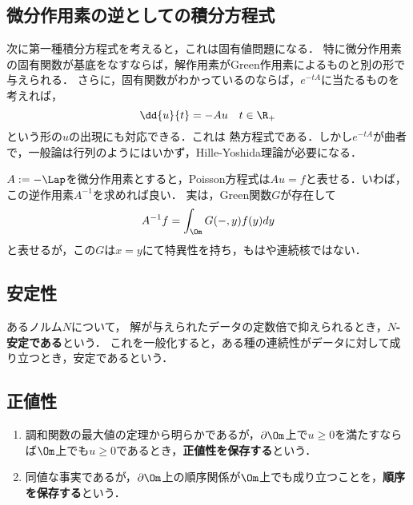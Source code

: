 \documentclass[uplatex,dvipdfmx]{jsreport}
\begin{document}
\subsection{微分作用素の逆としての積分方程式}

\begin{tcolorbox}[colframe=ForestGreen, colback=ForestGreen!10!white,breakable,colbacktitle=ForestGreen!40!white,coltitle=black,fonttitle=\bfseries\sffamily,
title=]
    次に第一種積分方程式を考えると，これは固有値問題になる．
    特に微分作用素の固有関数が基底をなすならば，解作用素がGreen作用素によるものと別の形で与えられる．
    さらに，固有関数がわかっているのならば，$e^{-tA}$に当たるものを考えれば，
    \[\dd{u}{t}=-Au\quad t\in\R_+\]
    という形の$u$の出現にも対応できる．これは
    熱方程式である．しかし$e^{-tA}$が曲者で，一般論は行列のようにはいかず，Hille-Yoshida理論が必要になる．
\end{tcolorbox}

\begin{example}[Laplacianの逆]
    $A:=-\Lap$を微分作用素とすると，Poisson方程式は$Au=f$と表せる．いわば，この逆作用素$A^{-1}$を求めれば良い．
    実は，Green関数$G$が存在して
    \[A^{-1}f=\int_\Om G(-,y)f(y)dy\]
    と表せるが，この$G$は$x=y$にて特異性を持ち，もはや連続核ではない．
\end{example}



\subsection{安定性}

\begin{definition}
    あるノルム$N$について，
    解が与えられたデータの定数倍で抑えられるとき，\textbf{$N$-安定である}という．
    これを一般化すると，ある種の連続性がデータに対して成り立つとき，安定であるという．
\end{definition}

\subsection{正値性}

\begin{definition}\mbox{}
    \begin{enumerate}
        \item 調和関数の最大値の定理から明らかであるが，$\partial\Om$上で$u\ge0$を満たすならば$\Om$上でも$u\ge0$であるとき，\textbf{正値性を保存する}という．
        \item 同値な事実であるが，$\partial\Om$上の順序関係が$\Om$上でも成り立つことを，\textbf{順序を保存する}という．
    \end{enumerate}
\end{definition}
\end{document}
